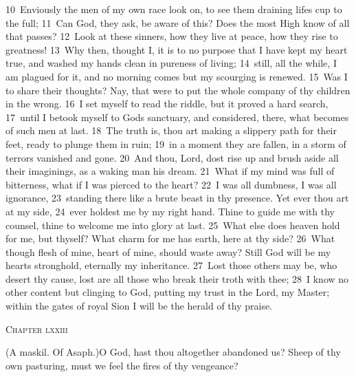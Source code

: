 \documentclass[10pt]{book} %
\begin{document}
\textcolor{benred8}{10}~Enviously the men of my own race look on, to see them draining life\textquotesingle s cup to the full; \textcolor{benred8}{11}~Can God, they ask, be aware of this? Does the most High know of all that passes? \textcolor{benred8}{12}~Look at these sinners, how they live at peace, how they rise to greatness! \textcolor{benred8}{13}~Why then, thought I, it is to no purpose that I have kept my heart true, and washed my hands clean in pureness of living; \textcolor{benred8}{14}~still, all the while, I am plagued for it, and no morning comes but my scourging is renewed. \textcolor{benred8}{15}~Was I to share their thoughts? Nay, that were to put the whole company of thy children in the wrong. \textcolor{benred8}{16}~I set myself to read the riddle, but it proved a hard search, \textcolor{benred8}{17}~until I betook myself to God\textquotesingle s sanctuary, and considered, there, what becomes of such men at last. \textcolor{benred8}{18}~The truth is, thou art making a slippery path for their feet, ready to plunge them in ruin; \textcolor{benred8}{19}~in a moment they are fallen, in a storm of terrors vanished and gone. \textcolor{benred8}{20}~And thou, Lord, dost rise up and brush aside all their imaginings, as a waking man his dream.
\textcolor{benred8}{21}~What if my mind was full of bitterness, what if I was pierced to the heart? \textcolor{benred8}{22}~I was all dumbness, I was all ignorance, \textcolor{benred8}{23}~standing there like a brute beast in thy presence. Yet ever thou art at my side, \textcolor{benred8}{24}~ever holdest me by my right hand. Thine to guide me with thy counsel, thine to welcome me into glory at last. \textcolor{benred8}{25}~What else does heaven hold for me, but thyself? What charm for me has earth, here at thy side? \textcolor{benred8}{26}~What though flesh of mine, heart of mine, should waste away? Still God will be my heart\textquotesingle s stronghold, eternally my inheritance. \textcolor{benred8}{27}~Lost those others may be, who desert thy cause, lost are all those who break their troth with thee; \textcolor{benred8}{28}~I know no other content but clinging to God, putting my trust in the Lord, my Master; within the gates of royal Sion I will be the herald of thy praise.
\begin{large}\begin{center}\textsc{Chapter lxxiii}\end{center}\end{large}
(A maskil. Of Asaph.)O God, hast thou altogether abandoned us? Sheep of thy own pasturing, must we feel the fires of thy vengeance?
\end{document}
